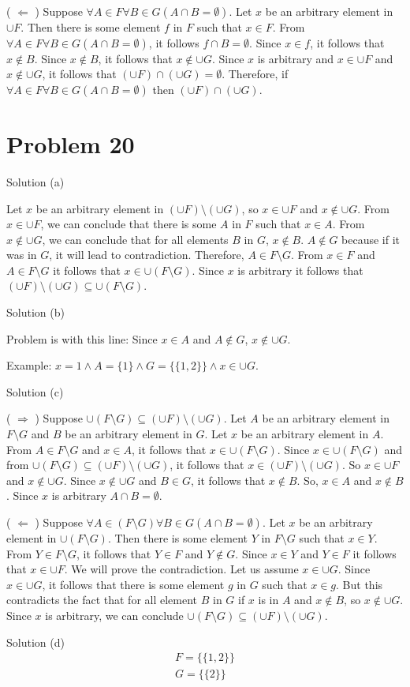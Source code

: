 \documentclass{article}
\begin{document}
( $\Leftarrow$ ) Suppose $\forall A \in F \forall B \in G (A \cap B =
\emptyset)$. Let $x$ be an arbitrary element in $\cup F$. Then there
is some element $f$ in $F$ such that $x \in F$. From $\forall A \in F
\forall B \in G (A \cap B = \emptyset)$, it follows $f \cap B =
\emptyset$. Since $x \in f$, it follows that $x \notin B$. Since $x
\notin B$, it follows that $x \notin \cup G$. Since $x$ is arbitrary
and $x \in \cup F$ and $x \notin \cup G$, it follows that $(\cup F)
\cap (\cup G) = \emptyset$. Therefore, if $\forall A \in F \forall B
\in G (A \cap B = \emptyset)$ then $(\cup F) \cap (\cup G)$.

\section{Problem 20}

Solution (a)

Let $x$ be an arbitrary element in $(\cup F) \setminus (\cup G)$, so
$x \in \cup F$ and $x \notin \cup G$. From $x \in \cup F$, we can
conclude that there is some $A$ in $F$ such that $x \in A$. From $x
\notin \cup G$, we can conclude that for all elements $B$ in $G$, $x
\notin B$. $A \notin G$ because if it was in $G$, it will lead to
contradiction. Therefore, $A \in F \setminus G$. From $x \in F$ and $A
\in F \setminus G$ it follows that $x \in \cup (F \setminus G)$. Since
$x$ is arbitrary it follows that $(\cup F) \setminus (\cup G)
\subseteq \cup (F \setminus G)$.

Solution (b)

Problem is with this line: Since $x \in A$ and $A \notin G$, $x \notin
\cup G$.

Example: $x = 1 \land A = \{1\} \land G = \{\{1,2\}\} \land x
\in \cup G$.

Solution (c)

( $\Rightarrow$ ) Suppose $\cup(F \setminus G) \subseteq (\cup F)
\setminus (\cup G)$. Let $A$ be an arbitrary element in $F \setminus
G$ and $B$ be an arbitrary element in $G$. Let $x$ be an arbitrary
element in $A$. From $A \in F \setminus G$ and $x \in A$, it follows
that $x \in \cup (F \setminus G)$. Since $x \in \cup(F \setminus G)$
and from $\cup(F \setminus G) \subseteq (\cup F) \setminus (\cup G)$,
it follows that $x \in (\cup F) \setminus (\cup G)$. So $x \in \cup F$
and $x \notin \cup G$. Since $x \notin \cup G$ and $B \in G$, it
follows that $x \notin B$. So, $x \in A$ and $x \notin B$. Since $x$
is arbitrary $A \cap B = \emptyset$.

( $\Leftarrow$ ) Suppose $\forall A \in (F \setminus G) \forall B \in
G(A \cap B = \emptyset)$. Let $x$ be an arbitrary element in $\cup(F
\setminus G)$. Then there is some element $Y$ in $F \setminus G$ such
that $x \in Y$. From $Y \in F \setminus G$, it follows that $Y \in F$
and $Y \notin G$. Since $x \in Y$ and $Y \in F$ it follows that $x \in
\cup F$. We will prove the contradiction. Let us assume $x \in \cup
G$. Since $x \in \cup G$, it follows that there is some element $g$ in
$G$ such that $x \in g$. But this contradicts the fact that for all
element $B$ in $G$ if $x$ is in $A$ and $x \notin B$, so $x \notin \cup
G$. Since $x$ is arbitrary, we can conclude $\cup (F \setminus G)
\subseteq (\cup F) \setminus (\cup G)$.

Solution (d)
\begin{align*}
F = \{\{1,2\}\} \\
G = \{\{2\}\}  
\end{align*}
\end{document}

